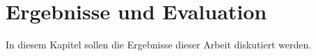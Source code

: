 \chapter{Ergebnisse und Evaluation}
In diesem Kapitel sollen die Ergebnisse dieser Arbeit diskutiert werden. 
